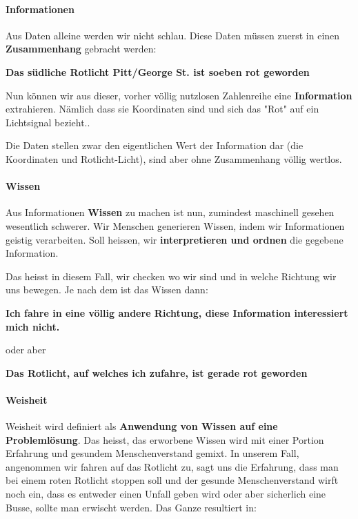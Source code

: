 \documentclass[a4paper, 11pt]{article}
\begin{document}
\paragraph{Informationen}
Aus Daten alleine werden wir nicht schlau. Diese Daten müssen zuerst in einen \textbf{Zusammenhang} gebracht werden:

\begin{center}
\textbf{	Das südliche Rotlicht Pitt/George St. ist soeben rot geworden }
\end{center}

Nun können wir aus dieser, vorher völlig nutzlosen Zahlenreihe eine \textbf{Information} extrahieren. Nämlich dass sie Koordinaten sind und sich das "Rot" auf ein Lichtsignal bezieht..

Die Daten stellen zwar den eigentlichen Wert der Information dar (die Koordinaten und Rotlicht-Licht), sind aber ohne Zusammenhang völlig wertlos.

\paragraph{Wissen}
Aus Informationen \textbf{Wissen} zu machen ist nun, zumindest maschinell gesehen wesentlich schwerer. Wir Menschen generieren Wissen, indem wir Informationen geistig verarbeiten. Soll heissen, wir \textbf{interpretieren und ordnen} die gegebene Information.

Das heisst in diesem Fall, wir checken wo wir sind und in welche Richtung wir uns bewegen. Je nach dem ist das Wissen dann:

\begin{center}
\textbf{	Ich fahre in eine völlig andere Richtung, diese Information interessiert mich nicht.}
\end{center}

oder aber

\begin{center}
\textbf{	Das Rotlicht, auf welches ich zufahre, ist gerade rot geworden}
\end{center}

\paragraph{Weisheit}
Weisheit wird definiert als \textbf{Anwendung von Wissen auf eine Problemlösung}. Das heisst, das erworbene Wissen wird mit einer Portion Erfahrung und gesundem Menschenverstand gemixt. In unserem Fall, angenommen wir fahren auf das Rotlicht zu, sagt uns die Erfahrung, dass man bei einem roten Rotlicht stoppen soll und der gesunde Menschenverstand wirft noch ein, dass es entweder einen Unfall geben wird oder aber sicherlich eine Busse, sollte man erwischt werden. Das Ganze resultiert in:
\end{document}
